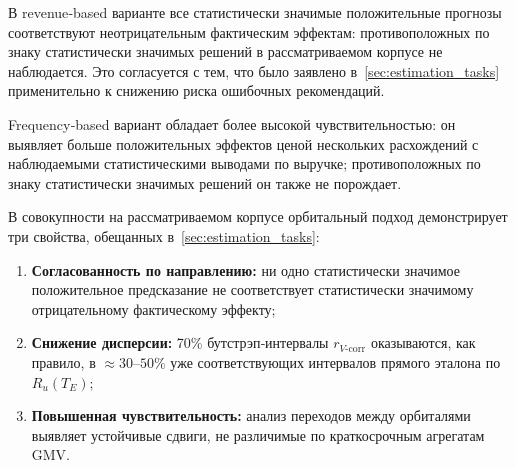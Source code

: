 В revenue‑based варианте все статистически значимые положительные
прогнозы соответствуют неотрицательным фактическим эффектам:
противоположных по знаку статистически значимых решений в
рассматриваемом корпусе не наблюдается. Это согласуется с тем,
что было заявлено в~\ref{sec:estimation_tasks} применительно к
снижению риска ошибочных рекомендаций.

Frequency‑based вариант обладает более высокой чувствительностью:
он выявляет больше положительных эффектов ценой нескольких
расхождений с наблюдаемыми статистическими выводами по выручке;
противоположных по знаку статистически значимых решений он также не
порождает.

В совокупности на рассматриваемом корпусе орбитальный подход
демонстрирует три свойства, обещанных в~\ref{sec:estimation_tasks}:
\begin{enumerate}
    \item \textbf{Согласованность по направлению:} ни одно
          статистически значимое положительное предсказание не
          соответствует статистически значимому отрицательному
          фактическому эффекту;
    \item \textbf{Снижение дисперсии:} 70\% бутстрэп‑интервалы
          $r_{V\text{-corr}}$ оказываются, как правило, в
          $\approx 30$--$50\%$ уже соответствующих интервалов прямого
          эталона по $R_u(T_E)$;
    \item \textbf{Повышенная чувствительность:} анализ переходов
          между орбиталями выявляет устойчивые сдвиги, не различимые
          по краткосрочным агрегатам GMV.
\end{enumerate}


